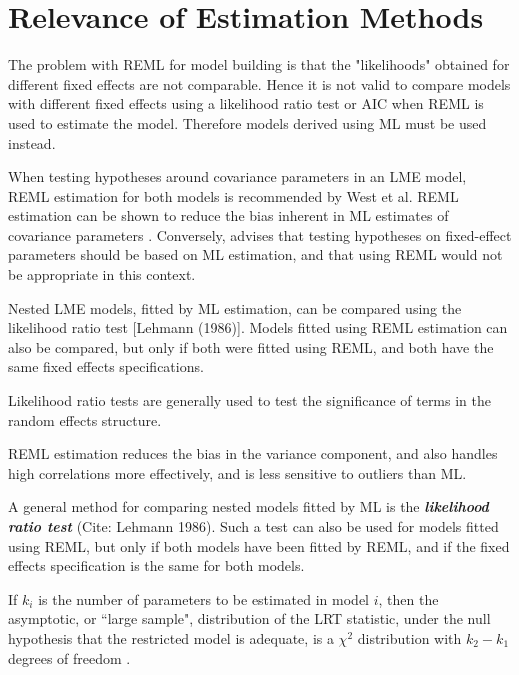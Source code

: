 \documentclass[12pt, a4paper]{report}
\theoremstyle{plain}
\theoremstyle{definition}
\theoremstyle{remark}
\begin{document}
\section{Relevance of Estimation Methods}

The problem with REML for model building is that the "likelihoods" obtained for different fixed effects are not comparable. Hence it is not valid to compare models with different fixed effects using a likelihood ratio test or AIC when REML is used to estimate the model. Therefore models derived using ML must be used instead.

When testing hypotheses around covariance parameters in an LME model, REML estimation for both models is recommended by West et al. REML estimation can be shown to reduce the bias inherent in ML estimates of covariance parameters \citep{west}. Conversely, \citet{pb} advises that testing hypotheses on fixed-effect parameters should be based on ML estimation, and that using REML would not be appropriate in this context.

Nested LME models, fitted by ML estimation, can be compared using the likelihood ratio test [Lehmann (1986)].
Models fitted using REML estimation can also be compared, but only if both were fitted using REML, and both have the same fixed effects specifications.

Likelihood ratio tests are generally used to test the significance of terms in the random effects structure.

REML estimation reduces the bias in the variance component, and also handles high correlations more effectively, and is less sensitive to outliers than ML.  




A general method for comparing nested models fitted by ML is the \textbf{\emph{likelihood ratio test}} (Cite: Lehmann 1986). Such a test can also be used for models fitted using REML, but only if both models have been fitted by REML, and if the fixed effects specification is the same for both models.

If $k_i$ is the number of parameters to be estimated in model $i$, then the asymptotic, or ``large sample", distribution of the LRT statistic, under the null hypothesis that the restricted model is adequate, is a $\chi^2$ distribution with $k_2-k_1$ degrees of freedom \citep[pg.83]{pb}.
\end{document}
